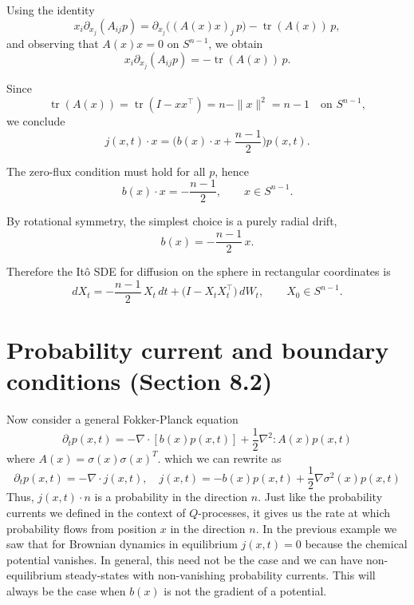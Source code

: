 \documentclass[11pt]{article}
\begin{document}
Using the identity
\begin{equation}
x_i \partial_{x_j}(A_{ij}p)
=
\partial_{x_j}\!\big( (A(x)x)_j\,p \big)
-
\operatorname{tr}(A(x))\,p,
\end{equation}
and observing that $A(x)x = 0$ on $S^{n-1}$, we obtain
\begin{equation}
x_i \partial_{x_j}(A_{ij}p)
=
- \operatorname{tr}(A(x))\,p.
\end{equation}

Since
\begin{equation}
\operatorname{tr}(A(x))
=
\operatorname{tr}(I - xx^\top)
=
n - \|x\|^2
=
n-1
\quad \text{on } S^{n-1},
\end{equation}
we conclude
\begin{equation}
j(x,t)\cdot x
=
\Big(
b(x)\cdot x
+
\frac{n-1}{2}
\Big)
p(x,t).
\end{equation}

The zero-flux condition must hold for all $p$, hence
\begin{equation}
b(x)\cdot x
=
-\frac{n-1}{2},
\qquad x\in S^{n-1}.
\end{equation}

By rotational symmetry, the simplest choice is a purely radial drift,
\begin{equation}
b(x)
=
-\frac{n-1}{2}\,x.
\end{equation}

Therefore the It\^o SDE for diffusion on the sphere in rectangular coordinates is
\begin{equation}
dX_t
=
-\frac{n-1}{2}\,X_t\,dt
+
\bigl(I - X_t X_t^\top\bigr)\,dW_t,
\qquad
X_0 \in S^{n-1}.
\end{equation}


\section*{Probability current and boundary conditions (Section 8.2)}
Now consider a general Fokker-Planck equation 
\begin{equation}
\partial_t p(x,t) = -\nabla \cdot [b(x)p(x,t)] + \frac{1}{2} \nabla^2: A(x)p(x,t)
\end{equation}
where $A(x) = \sigma(x)\sigma(x)^T$. 
which we can rewrite as
\begin{equation}
\partial_t p(x,t) = -\nabla \cdot j(x,t),\quad j(x,t) = - b(x)p(x,t) + \frac{1}{2} \nabla  \sigma^2(x)p(x,t)
\end{equation}
Thus, $j(x,t) \cdot n$ is a probability in the direction $n$. Just like the probability currents we defined in the context of $Q$-processes, it gives us the rate at which probability flows from position $x$ in the direction $n$. In the previous example we saw that for Brownian dynamics in equilibrium $j(x,t) =0$ because the chemical potential vanishes. In general, this need not be the case and we can have non-equilibrium steady-states with non-vanishing probability currents. This will always be the case when $b(x)$ is not the gradient of a potential. 
\end{document}
